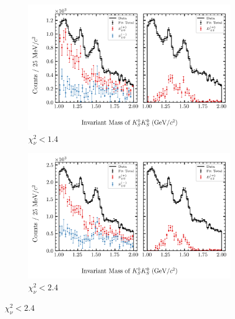 \begin{figure}[htbp]
    \centering
    \begin{subfigure}{0.45\textwidth}
        \includegraphics[width=\linewidth]{figures/binned_fit_chisqdof_1.4_splot_D_1s_2b_phase_factor_waves29099_uncertainty_bootstrap-CI-BC.png}
        \caption{$\chi^2_\nu < 1.4$}
    \end{subfigure}
    \hfill
    \begin{subfigure}{0.45\textwidth}
        \includegraphics[width=\linewidth]{figures/binned_fit_chisqdof_2.4_splot_D_1s_2b_phase_factor_waves29099_uncertainty_bootstrap-CI-BC.png}
        \caption{$\chi^2_\nu < 2.4$}
    \end{subfigure}

    \vspace{1em}


\end{figure}
